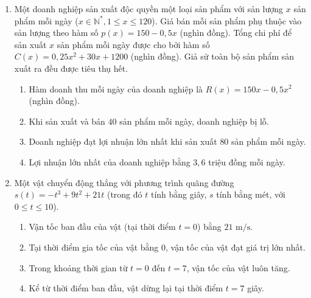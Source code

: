 \documentclass[12pt,a4paper]{article}
\begin{document}
\begin{enumerate}
\item Một doanh nghiệp sản xuất độc quyền một loại sản phẩm với sản lượng $x$ sản phẩm mỗi ngày ($x \in \mathbb{N}^*, 1 \le x \le 120$). Giá bán mỗi sản phẩm phụ thuộc vào sản lượng theo hàm số $p(x) = 150 - 0{,}5x$ (nghìn đồng). Tổng chi phí để sản xuất $x$ sản phẩm mỗi ngày được cho bởi hàm số $C(x) = 0{,}25x^2 + 30x + 1200$ (nghìn đồng). Giả sử toàn bộ sản phẩm sản xuất ra đều được tiêu thụ hết.
\begin{enumerate}[label=\alph*)]
\item Hàm doanh thu mỗi ngày của doanh nghiệp là $R(x) = 150x - 0{,}5x^2$ (nghìn đồng).
\item Khi sản xuất và bán $40$ sản phẩm mỗi ngày, doanh nghiệp bị lỗ.
\item Doanh nghiệp đạt lợi nhuận lớn nhất khi sản xuất $80$ sản phẩm mỗi ngày.
\item Lợi nhuận lớn nhất của doanh nghiệp bằng $3{,}6$ triệu đồng mỗi ngày.
\end{enumerate}

\item Một vật chuyển động thẳng với phương trình quãng đường $s(t) = -t^3 + 9t^2 + 21t$ (trong đó $t$ tính bằng giây, $s$ tính bằng mét, với $0 \le t \le 10$).
\begin{enumerate}[label=\alph*)]
\item Vận tốc ban đầu của vật (tại thời điểm $t = 0$) bằng $21\text{ m/s}$.
\item Tại thời điểm gia tốc của vật bằng $0$, vận tốc của vật đạt giá trị lớn nhất.
\item Trong khoảng thời gian từ $t = 0$ đến $t = 7$, vận tốc của vật luôn tăng.
\item Kể từ thời điểm ban đầu, vật dừng lại tại thời điểm $t = 7$ giây.
\end{enumerate}
\end{enumerate}

\newpage
\end{document}
